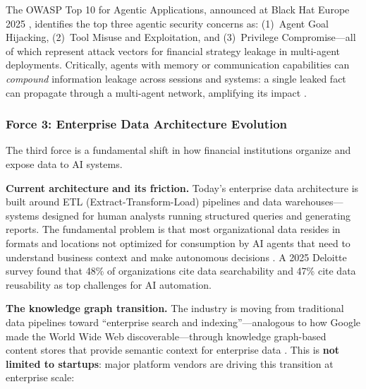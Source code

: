 \documentclass[12pt,a4paper]{article}
\begin{document}
The OWASP Top 10 for Agentic Applications, announced at Black Hat Europe 2025 \cite{owasp_agentic_promptfoo}, identifies the top three agentic security concerns as: (1)~Agent Goal Hijacking, (2)~Tool Misuse and Exploitation, and (3)~Privilege Compromise---all of which represent attack vectors for financial strategy leakage in multi-agent deployments. Critically, agents with memory or communication capabilities can \textit{compound} information leakage across sessions and systems: a single leaked fact can propagate through a multi-agent network, amplifying its impact \cite{lasso_owasp_2025}.

\subsubsection{Force 3: Enterprise Data Architecture Evolution}
\label{sec:data_architecture}

The third force is a fundamental shift in how financial institutions organize and expose data to AI systems.

\textbf{Current architecture and its friction.} Today's enterprise data architecture is built around ETL (Extract-Transform-Load) pipelines and data warehouses---systems designed for human analysts running structured queries and generating reports. The fundamental problem is that most organizational data resides in formats and locations not optimized for consumption by AI agents that need to understand business context and make autonomous decisions \cite{deloitte_agentic_2025}. A 2025 Deloitte survey found that 48\% of organizations cite data searchability and 47\% cite data reusability as top challenges for AI automation.

\textbf{The knowledge graph transition.} The industry is moving from traditional data pipelines toward ``enterprise search and indexing''---analogous to how Google made the World Wide Web discoverable---through knowledge graph-based content stores that provide semantic context for enterprise data \cite{graphwise_enterprise_ai_2026}. This is \textbf{not limited to startups}: major platform vendors are driving this transition at enterprise scale:
\end{document}
